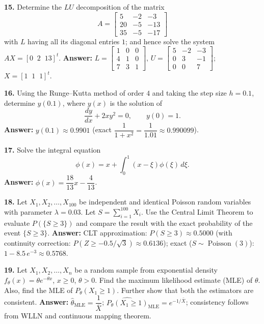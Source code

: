 \documentclass[11pt,a4paper]{article}
\newcommand{\ans}[1]{\textbf{Answer:} #1\par\medskip}
\begin{document}
\textbf{15.} Determine the $LU$ decomposition of the matrix
\[
  A = \begin{bmatrix}
    5 & -2 & -3 \\
    20 & -5 & -13 \\
    35 & -5 & -17
  \end{bmatrix}
\]
with $L$ having all its diagonal entries $1$; and hence solve the system $AX = [0\;\;2\;\;13]^t$.
\ans{$L = \begin{bmatrix} 1 & 0 & 0 \\ 4 & 1 & 0 \\ 7 & 3 & 1 \end{bmatrix}$, $U = \begin{bmatrix} 5 & -2 & -3 \\ 0 & 3 & -1 \\ 0 & 0 & 7 \end{bmatrix}$; \quad $X = [1\;\;1\;\;1]^t$.}

\textbf{16.} Using the Runge--Kutta method of order $4$ and taking the step size $h = 0.1$, determine $y(0.1)$, where $y(x)$ is the solution of
\[
  \frac{dy}{dx} + 2xy^2 = 0, \qquad y(0) = 1.
\]
\ans{$y(0.1) \approx 0.9901$ (exact $\dfrac{1}{1 + x^2} = \dfrac{1}{1.01} \approx 0.990099$).}

\textbf{17.} Solve the integral equation
\[
  \phi(x) = x + \int_0^1 (x - \xi)\phi(\xi)\,d\xi.
\]
\ans{$\phi(x) = \dfrac{18}{13}x - \dfrac{4}{13}$.}

\textbf{18.} Let $X_1, X_2, \dots, X_{100}$ be independent and identical Poisson random variables with parameter $\lambda = 0.03$. Let $S = \displaystyle\sum_{i=1}^{100} X_i$. Use the Central Limit Theorem to evaluate $P(\{S \ge 3\})$ and compare the result with the exact probability of the event $\{S \ge 3\}$.
\ans{CLT approximation: $P(S \ge 3) \approx 0.5000$ (with continuity correction: $P(Z \ge -0.5/\sqrt{3}) \approx 0.6136$); exact ($S \sim \operatorname{Poisson}(3)$): $1 - 8.5\,e^{-3} \approx 0.5768$.}

\textbf{19.} Let $X_1, X_2, \dots, X_n$ be a random sample from exponential density $f_\theta(x) = \theta e^{-\theta x}$, $x \ge 0$, $\theta > 0$. Find the maximum likelihood estimate (MLE) of $\theta$. Also, find the MLE of $P_\theta(X_1 \ge 1)$. Further show that both the estimators are consistent.
\ans{$\hat{\theta}_{\text{MLE}} = \dfrac{1}{\bar{X}}$; \quad $\widehat{P_\theta(X_1 \ge 1)}_{\text{MLE}} = e^{-1/\bar{X}}$; consistency follows from WLLN and continuous mapping theorem.}
\end{document}
